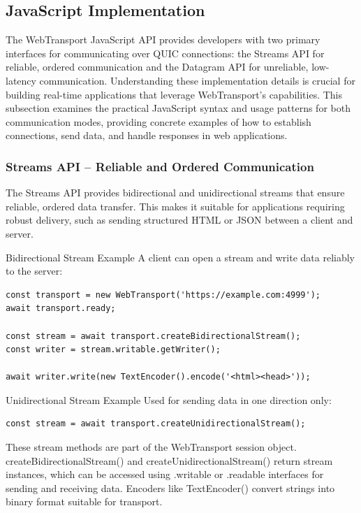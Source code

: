 \subsection{JavaScript Implementation}

The WebTransport JavaScript API provides developers with two primary interfaces for communicating over QUIC connections: the Streams API for reliable, ordered communication and the Datagram API for unreliable, low-latency communication. Understanding these implementation details is crucial for building real-time applications that leverage WebTransport's capabilities. This subsection examines the practical JavaScript syntax and usage patterns for both communication modes, providing concrete examples of how to establish connections, send data, and handle responses in web applications.

\subsubsection{Streams API – Reliable and Ordered Communication}

The Streams API provides bidirectional and unidirectional streams that ensure reliable, ordered data transfer. This makes it suitable for applications requiring robust delivery, such as sending structured HTML or JSON between a client and server.

Bidirectional Stream Example  
A client can open a stream and write data reliably to the server:

\begin{verbatim}
const transport = new WebTransport('https://example.com:4999'); 
await transport.ready; 

const stream = await transport.createBidirectionalStream(); 
const writer = stream.writable.getWriter(); 

await writer.write(new TextEncoder().encode('<html><head>')); 
\end{verbatim}

Unidirectional Stream Example  
Used for sending data in one direction only:

\begin{verbatim}
const stream = await transport.createUnidirectionalStream();
\end{verbatim}

These stream methods are part of the WebTransport session object. createBidirectionalStream() and createUnidirectionalStream() return stream instances, which can be accessed using .writable or .readable interfaces for sending and receiving data. Encoders like TextEncoder() convert strings into binary format suitable for transport.

